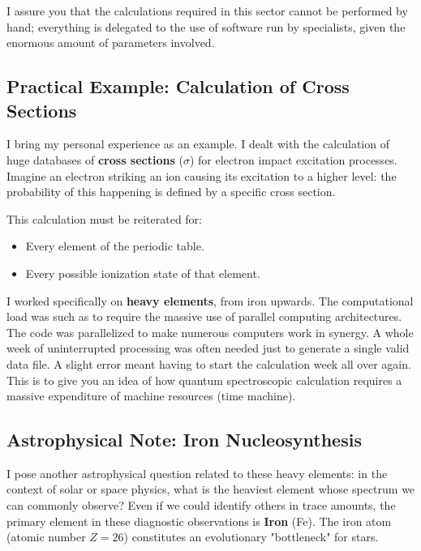I assure you that the calculations required in this sector cannot be performed by hand; everything is delegated to the use of software run by specialists, given the enormous amount of parameters involved.

    \subsection{Practical Example: Calculation of Cross Sections}
    
    I bring my personal experience as an example. I dealt with the calculation of huge databases of \textbf{cross sections} ($\sigma$) for electron impact excitation processes. Imagine an electron striking an ion causing its excitation to a higher level: the probability of this happening is defined by a specific cross section.
    
    This calculation must be reiterated for:
    \begin{itemize}
        \item Every element of the periodic table.
        \item Every possible ionization state of that element.
    \end{itemize}
    
    I worked specifically on \textbf{heavy elements}, from iron upwards. The computational load was such as to require the massive use of parallel computing architectures. The code was parallelized to make numerous computers work in synergy. A whole week of uninterrupted processing was often needed just to generate a single valid data file. A slight error meant having to start the calculation week all over again. This is to give you an idea of how quantum spectroscopic calculation requires a massive expenditure of machine resources (time machine).
    
    \subsection{Astrophysical Note: Iron Nucleosynthesis}
    
    I pose another astrophysical question related to these heavy elements: in the context of solar or space physics, what is the heaviest element whose spectrum we can commonly observe?
    Even if we could identify others in trace amounts, the primary element in these diagnostic observations is \textbf{Iron} (Fe). The iron atom (atomic number $Z=26$) constitutes an evolutionary "bottleneck" for stars.
    

